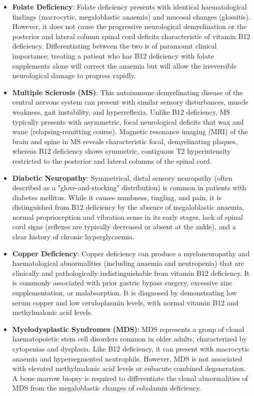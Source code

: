 \begin{itemize}
    \item \textbf{Folate Deficiency}: Folate deficiency presents with identical haematological findings (macrocytic, megaloblastic anaemia) and mucosal changes (glossitis). However, it does not cause the progressive neurological demyelination or the posterior and lateral column spinal cord deficits characteristic of vitamin B12 deficiency. Differentiating between the two is of paramount clinical importance; treating a patient who has B12 deficiency with folate supplements alone will correct the anaemia but will allow the irreversible neurological damage to progress rapidly.
    \item \textbf{Multiple Sclerosis (MS)}: This autoimmune demyelinating disease of the central nervous system can present with similar sensory disturbances, muscle weakness, gait instability, and hyperreflexia. Unlike B12 deficiency, MS typically presents with asymmetric, focal neurological deficits that wax and wane (relapsing-remitting course). Magnetic resonance imaging (MRI) of the brain and spine in MS reveals characteristic focal, demyelinating plaques, whereas B12 deficiency shows symmetric, contiguous T2 hyperintensity restricted to the posterior and lateral columns of the spinal cord.
    \item \textbf{Diabetic Neuropathy}: Symmetrical, distal sensory neuropathy (often described as a "glove-and-stocking" distribution) is common in patients with diabetes mellitus. While it causes numbness, tingling, and pain, it is distinguished from B12 deficiency by the absence of megaloblastic anaemia, normal proprioception and vibration sense in its early stages, lack of spinal cord signs (reflexes are typically decreased or absent at the ankle), and a clear history of chronic hyperglycaemia.
    \item \textbf{Copper Deficiency}: Copper deficiency can produce a myeloneuropathy and haematological abnormalities (including anaemia and neutropenia) that are clinically and pathologically indistinguishable from vitamin B12 deficiency. It is commonly associated with prior gastric bypass surgery, excessive zinc supplementation, or malabsorption. It is diagnosed by demonstrating low serum copper and low ceruloplasmin levels, with normal vitamin B12 and methylmalonic acid levels.
    \item \textbf{Myelodysplastic Syndromes (MDS)}: MDS represents a group of clonal haematopoietic stem cell disorders common in older adults, characterized by cytopenias and dysplasia. Like B12 deficiency, it can present with macrocytic anaemia and hypersegmented neutrophils. However, MDS is not associated with elevated methylmalonic acid levels or subacute combined degeneration. A bone marrow biopsy is required to differentiate the clonal abnormalities of MDS from the megaloblastic changes of cobalamin deficiency.

\end{itemize}
